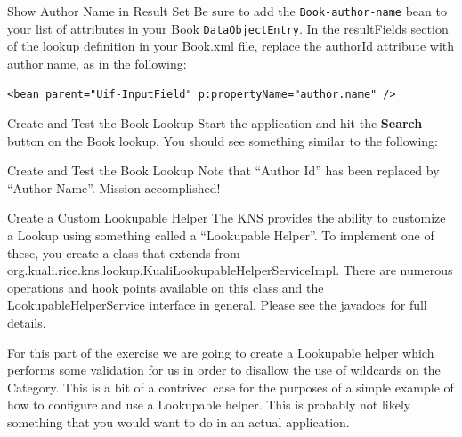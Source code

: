 \documentclass[xcolor=dvipsnames,14pt,professionalfonts]{beamer}
\begin{document}
\begin{frame}[fragile]{Show Author Name in Result Set}
 Be sure to add the \texttt{Book-author-name} bean to your list of attributes in your Book \texttt{DataObjectEntry}.
In the resultFields section of the lookup definition in your Book.xml file, replace the authorId attribute with author.name, as in the following:
    \begin{verbatim}
<bean parent="Uif-InputField" p:propertyName="author.name" />
    \end{verbatim}
\end{frame}

\begin{frame}{Create and Test the Book Lookup}
  Start the application and hit the \textbf{Search} button
  on the Book lookup.  You should see something similar
  to the following:
  \end{frame}

  \begin{frame}{Create and Test the Book Lookup}
    Note that “Author Id” has been replaced by “Author Name”.
      Mission accomplished!
  \end{frame}

  \begin{frame}{Create a Custom Lookupable Helper}
    The KNS provides the ability to customize a Lookup using something
    called a “Lookupable Helper”.  To implement one of these, you
    create a class that extends from
    org.kuali.rice.kns.lookup.KualiLookupableHelperServiceImpl.  There
    are numerous operations and hook points available on this class
    and the LookupableHelperService interface in general.  Please see
    the javadocs for full details.           

    For this part of the exercise we are going to create a Lookupable
    helper which performs some validation for us in order to disallow
    the use of wildcards on the Category.  This is a bit of a
    contrived case for the purposes of a simple example of how to
    configure and use a Lookupable helper.  This is probably not
    likely something that you would want to do in an actual
    application.
  \end{frame}
\end{document}
